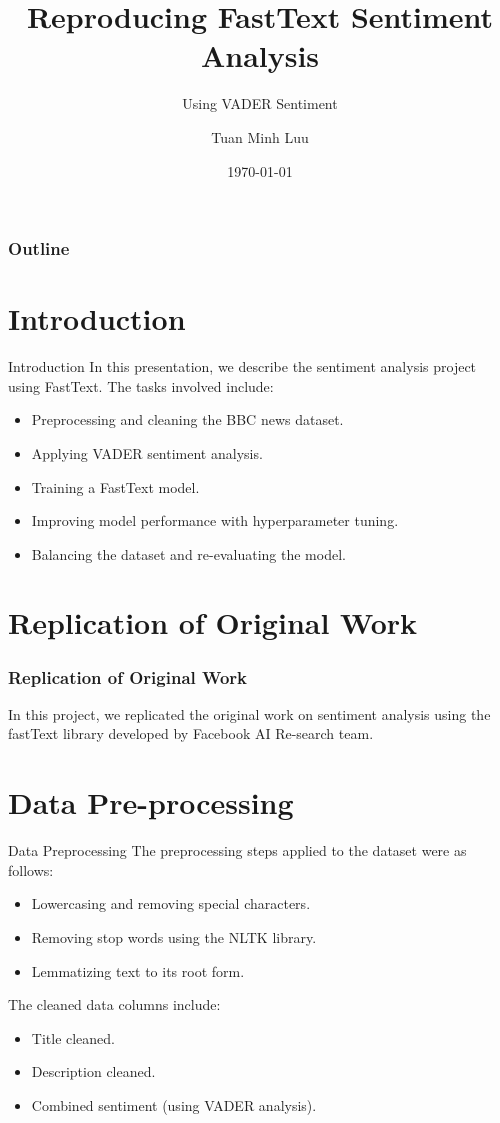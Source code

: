 \documentclass{beamer}
\title{Reproducing FastText Sentiment Analysis}
\subtitle{Using VADER Sentiment }
\author{Tuan Minh Luu}
\institute{Macquarie University}
\date{\today}
\begin{document}
\begin{frame}
    \titlepage
\end{frame}

\begin{frame}
    \frametitle{Outline}
    \tableofcontents
\end{frame}

\section{Introduction}
\begin{frame}{Introduction}
    In this presentation, we describe the sentiment analysis project using FastText. The tasks involved include:
    \begin{itemize}
                \item Preprocessing and cleaning the BBC news dataset.
    \item Applying VADER sentiment analysis.
    \item Training a FastText model.
    \item Improving model performance with hyperparameter tuning.
    \item Balancing the dataset and re-evaluating the model.
    \end{itemize}
    
\end{frame}

\section{Replication of Original Work}
\begin{frame}
    \frametitle{Replication of Original Work}
   In this project, we replicated the original work on sentiment analysis  using the fastText library developed by Facebook AI Re-search team.
\end{frame}


\section{Data Pre-processing}
\begin{frame}{Data Preprocessing}
The preprocessing steps applied to the dataset were as follows:
\begin{itemize}
\item Lowercasing and removing special characters.
        \item Removing stop words using the NLTK library.
\item Lemmatizing text to its root form.

\end{itemize}
\vspace{0.5cm}
The cleaned data columns include:
\begin{itemize}
    \item Title cleaned.
    \item Description cleaned.
    \item Combined sentiment (using VADER analysis).
\end{itemize}

\end{frame}
\end{document}
